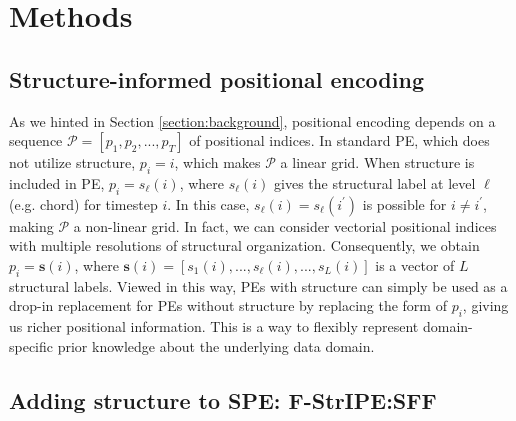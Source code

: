 \section{Methods} \label{section:methods}

\subsection{Structure-informed positional encoding}

As we hinted in Section \ref{section:background}, positional encoding depends on a sequence $\mathcal{P} = [ p_1, p_2, ... , p_T ]$ of positional indices. In standard PE, which does not utilize structure, $p_i = i$, which makes $\mathcal{P}$ a linear grid. When structure is included in PE, $p_i = s_\ell (i)$, where $s_\ell (i)$ gives the structural label at level $\ell$ (e.g. chord) for timestep $i$. In this case, $s_\ell (i) = s_\ell (i^{\prime})$ is possible for $i \neq i^{\prime}$, making $\mathcal{P}$ a non-linear grid. In fact, we can consider vectorial positional indices with multiple resolutions of structural organization. Consequently, we obtain $p_i = \mathbf{s} (i)$, where $\mathbf{s} (i) = [ s_1 (i) , ..., s_\ell (i), ..., s_L (i) ]$ is a vector of $L$ structural labels. Viewed in this way, PEs with structure can simply be used as a drop-in replacement for PEs without structure by replacing the form of $p_i$, giving us richer positional information. This is a way to flexibly represent domain-specific prior knowledge about the underlying data domain.

\subsection{Adding structure to SPE: F-StrIPE:SFF}

